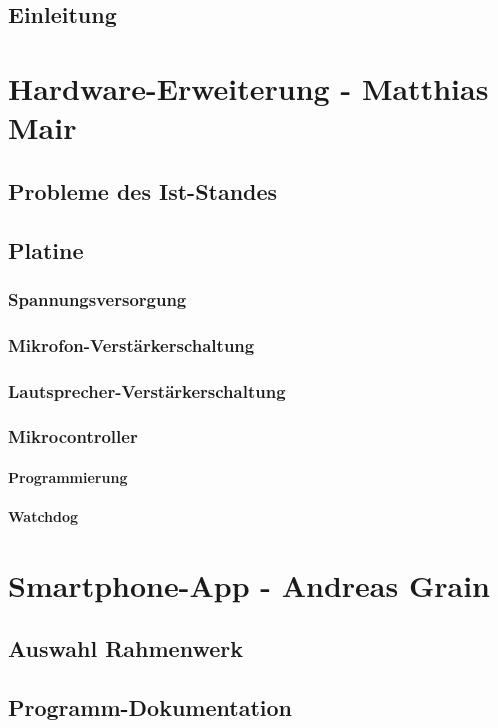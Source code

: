 \documentclass[a4paper, 12pt, twoside, openright
]{memoir}
\begin{document}
\mainmatter
\chapter{Einleitung}


\part{Hardware-Erweiterung - Matthias Mair}
\chapter{Probleme des Ist-Standes}
\chapter{Platine}
\section{Spannungsversorgung}
\section{Mikrofon-Verstärkerschaltung}
\section{Lautsprecher-Verstärkerschaltung}
\section{Mikrocontroller}
\subsection{Programmierung}
\subsection{Watchdog}

\part{Smartphone-App - Andreas Grain}
\chapter{Auswahl Rahmenwerk}

\chapter{Programm-Dokumentation}

\end{document}
